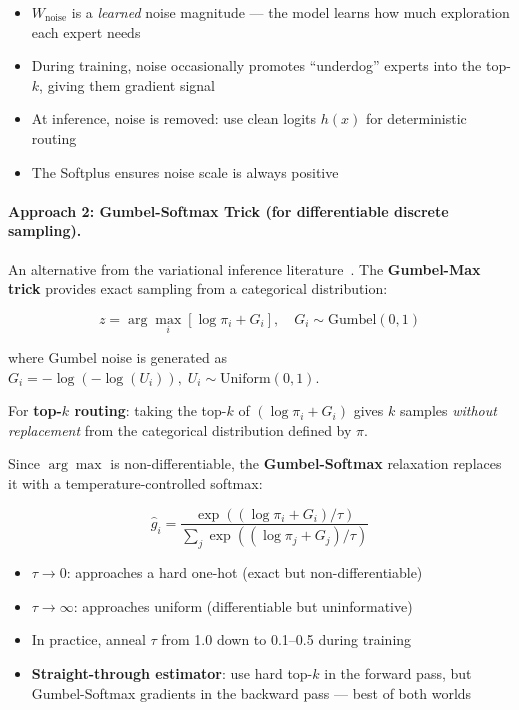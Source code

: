 \begin{itemize}
  \item $W_{\text{noise}}$ is a \emph{learned} noise magnitude --- the model learns how much exploration each expert needs
  \item During training, noise occasionally promotes ``underdog'' experts into the top-$k$, giving them gradient signal
  \item At inference, noise is removed: use clean logits $h(x)$ for deterministic routing
  \item The Softplus ensures noise scale is always positive
\end{itemize}

\paragraph{Approach 2: Gumbel-Softmax Trick (for differentiable discrete sampling).}
\label{approach-2-gumbel-softmax-trick-for-differentiable-discrete-sampling.}

An alternative from the variational inference literature~\cite{jang2017categorical}. The \textbf{Gumbel-Max trick} provides exact sampling from a categorical distribution:

\begin{equation}
  z = \arg\max_i \left[ \log \pi_i + G_i \right], \quad G_i \sim \text{Gumbel}(0,1)
\end{equation}

where Gumbel noise is generated as $G_i = -\log(-\log(U_i)),\; U_i \sim \text{Uniform}(0,1)$.

For \textbf{top-$k$ routing}: taking the top-$k$ of $(\log \pi_i + G_i)$ gives $k$ samples \emph{without replacement} from the categorical distribution defined by $\pi$.

Since $\arg\max$ is non-differentiable, the \textbf{Gumbel-Softmax} relaxation replaces it with a temperature-controlled softmax:

\begin{equation}
  \hat{g}_i = \frac{\exp\left((\log \pi_i + G_i) / \tau\right)}{\sum_j \exp\left((\log \pi_j + G_j) / \tau\right)}
\end{equation}

\begin{itemize}
  \item $\tau \to 0$: approaches a hard one-hot (exact but non-differentiable)
  \item $\tau \to \infty$: approaches uniform (differentiable but uninformative)
  \item In practice, anneal $\tau$ from 1.0 down to 0.1--0.5 during training
  \item \textbf{Straight-through estimator}: use hard top-$k$ in the forward pass, but Gumbel-Softmax gradients in the backward pass --- best of both worlds
\end{itemize}

